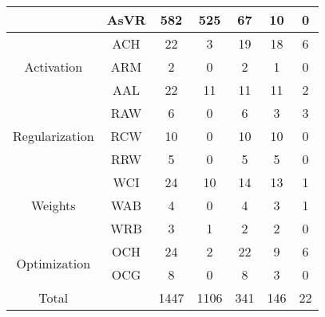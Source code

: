 \begin{table}[]
\begin{center}
\begin{tabular}{ccccccc}
  \multicolumn{1}{c|}{}                                & \multicolumn{1}{c|}{AsVR}  & \multicolumn{1}{c|}{582} &525        & \multicolumn{1}{c|}{67} &10          &0         \\ \hline
  \multicolumn{1}{c|}{\multirow{3}{*}{Activation}}     & \multicolumn{1}{c|}{ACH}   & \multicolumn{1}{c|}{22} &3        & \multicolumn{1}{c|}{19} &18          &6         \\
  \multicolumn{1}{c|}{}                                & \multicolumn{1}{c|}{ARM}   & \multicolumn{1}{c|}{2} &0        & \multicolumn{1}{c|}{2} &1          &0         \\
  \multicolumn{1}{c|}{}                                & \multicolumn{1}{c|}{AAL}   & \multicolumn{1}{c|}{22} &11        & \multicolumn{1}{c|}{11} &11          &2         \\ \hline
  \multicolumn{1}{c|}{\multirow{3}{*}{Regularization}} & \multicolumn{1}{c|}{RAW}   & \multicolumn{1}{c|}{6} &0        & \multicolumn{1}{c|}{6} &3          &3         \\
  \multicolumn{1}{c|}{}                                & \multicolumn{1}{c|}{RCW}   & \multicolumn{1}{c|}{10} &0        & \multicolumn{1}{c|}{10} &10          &0         \\
  \multicolumn{1}{c|}{}                                & \multicolumn{1}{c|}{RRW}   & \multicolumn{1}{c|}{5} &0        & \multicolumn{1}{c|}{5} &5          &0         \\ \hline
  \multicolumn{1}{c|}{\multirow{3}{*}{Weights}}        & \multicolumn{1}{c|}{WCI}   & \multicolumn{1}{c|}{24} &10        & \multicolumn{1}{c|}{14} &13          &1         \\
  \multicolumn{1}{c|}{}                                & \multicolumn{1}{c|}{WAB}   & \multicolumn{1}{c|}{4} &0        & \multicolumn{1}{c|}{4} &3          &1         \\
  \multicolumn{1}{c|}{}                                & \multicolumn{1}{c|}{WRB}   & \multicolumn{1}{c|}{3} &1        & \multicolumn{1}{c|}{2} &2          &0         \\ \hline
  \multicolumn{1}{c|}{\multirow{2}{*}{Optimization}}   & \multicolumn{1}{c|}{OCH}   & \multicolumn{1}{c|}{24} &2        & \multicolumn{1}{c|}{22} &9          &6         \\
  \multicolumn{1}{c|}{}                                & \multicolumn{1}{c|}{OCG}   & \multicolumn{1}{c|}{8} &0        & \multicolumn{1}{c|}{8} &3          &0         \\ \hline
  \multicolumn{1}{c|}{\multirow{1}{*}{Total}}   & \multicolumn{1}{c|}{}   & \multicolumn{1}{c|}{1447} &1106        & \multicolumn{1}{c|}{341} &146          &22         \\ \hline
  \end{tabular}
  \label{mutation_operator}
  \end{center}
  \end{table}
  

